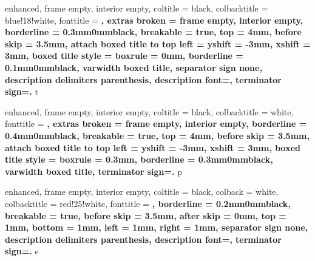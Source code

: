 \theoremstyle{definition}

\newtheorem{section-lemma}{Lema}[section]
\newtheorem{section-example}{Ejemplo}[section]
\newtheorem{section-theorem}{Teorema}[section]
\newtheorem{section-problem}{Problema}[section]
\newtheorem{section-property}{Propiedad}[section]
\newtheorem{section-exercise}{Ejercicio}[section]
\newtheorem{section-corollary}{Corolario}[section]
\newtheorem{section-definition}{Definición}[section]

\newtheorem{case}{Caso}
\newtheorem{example}{Ejemplo}
\newtheorem{exercise}{Ejercicio}
\newtheorem{problem}{Problema}
\newtheorem{remark}{Observación}
\newtheorem{corollary}{Corolario}

\newtheorem*{note}{Nota}
\newtheorem*{hint}{Pista}
\newtheorem*{definition}{Definición}


{
    enhanced,
    frame empty,
    interior empty,
    coltitle = black,
    colbacktitle = blue!18!white,
    fonttitle = \bfseries,
    extras broken = {frame empty, interior empty},
    borderline = {0.3mm}{0mm}{black},
    breakable = true,
    top = 4mm,
    before skip = 3.5mm,
    attach boxed title to top left = {yshift = -3mm, xshift = 3mm},
    boxed title style = {boxrule = 0mm, borderline = {0.1mm}{0mm}{black}},
    varwidth boxed title,
    separator sign none, description delimiters parenthesis,
    description font=\bfseries,
    terminator sign={.\hspace{1mm}}
}
{t}

{
    enhanced,
    frame empty,
    interior empty,
    coltitle = black,
    colbacktitle = white,
    fonttitle = \bfseries,
    extras broken = {frame empty, interior empty},
    borderline = {0.4mm}{0mm}{black},
    breakable = true,
    top = 4mm,
    before skip = 3.5mm,
    attach boxed title to top left = {yshift = -3mm, xshift = 3mm},
    boxed title style = {boxrule = 0.3mm, borderline = {0.3mm}{0mm}{black}},
    varwidth boxed title,
    terminator sign={.\hspace{1mm}}
}
{p}

{
    enhanced,
    frame empty,
    interior empty,
    coltitle = black,
    colback = white,
    colbacktitle = red!25!white,
    fonttitle = \bfseries,
    borderline = {0.2mm}{0mm}{black},
    breakable = true,
    before skip = 3.5mm,
    after skip = 0mm,
    top = 1mm,
    bottom = 1mm,
    left = 1mm,
    right = 1mm,
    separator sign none, description delimiters parenthesis,
    description font=\bfseries,
    terminator sign={.\hspace{1mm}}
}
{e}

